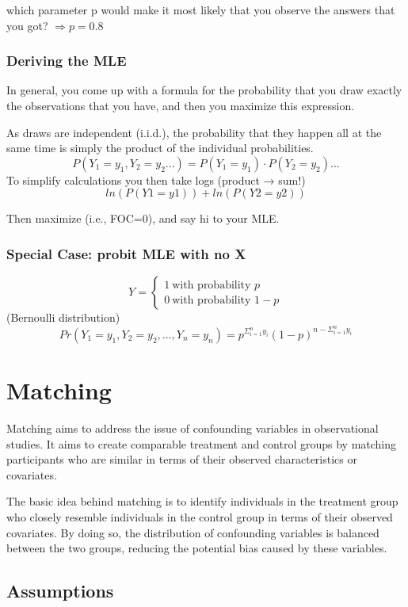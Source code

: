 \documentclass[a3paper, 8pt]{extarticle}
\begin{document}
\begin{multicols*}{5}
 which parameter p would make it most likely that you observe the answers that you got? $\Rightarrow p=0.8$

 \subsubsection{Deriving the MLE}
 In general, you come up with a formula for the probability that you draw exactly the observations that you have, and then you maximize this expression.

As draws are independent (i.i.d.), the probability that they happen all at the same time is simply the product of the individual probabilities.
$$P(Y_1=y_1, Y_2=y_2 ...)=P(Y_1=y_1)\cdot P(Y_2=y_2)...$$
To simplify calculations you then take logs (product → sum!)
$$ln(P(Y1 = y1))+ln(P(Y2 = y2))$$

Then maximize (i.e., FOC=0), and say hi to your MLE.

\subsubsection{Special Case: probit MLE with no X}

$$Y= \begin{cases} 1 \ \text{with probability $p$}\\
0 \ \text{with probability $1-p$}\end{cases}$$
(Bernoulli distribution)
$$Pr(Y_1=y_1, Y_2=y_2, ..., Y_n=y_n)= p^{\Sigma_{i=1}^n y_i} (1-p) ^{n-\Sigma_{i=1}^n y_i}$$



\section{Matching}
Matching aims to address the issue of confounding variables in observational studies. It aims to create comparable treatment and control groups by matching participants who are similar in terms of their observed characteristics or covariates.

The basic idea behind matching is to identify individuals in the treatment group who closely resemble individuals in the control group in terms of their observed covariates. By doing so, the distribution of confounding variables is balanced between the two groups, reducing the potential bias caused by these variables.

\subsection{Assumptions}


\end{multicols*}
\end{document}
